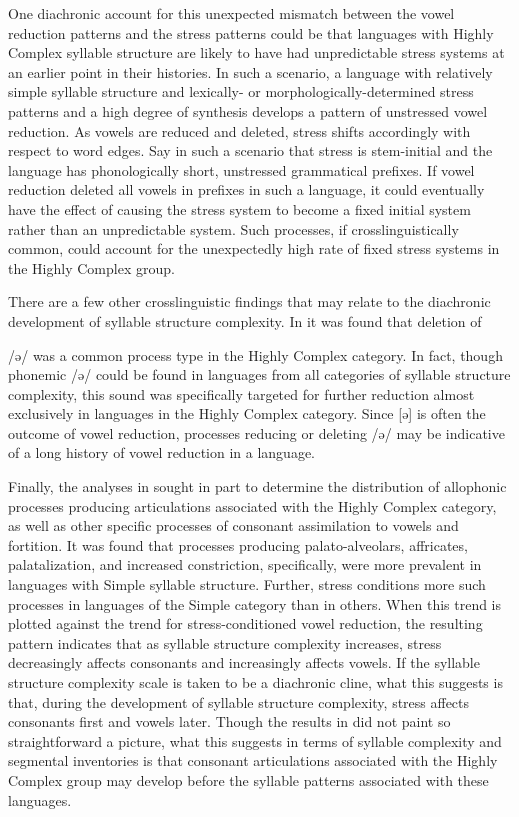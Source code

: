   One diachronic account for this unexpected mismatch between the vowel reduction patterns and the stress patterns could be that languages with Highly Complex syllable structure are likely to have had unpredictable stress systems at an earlier point in their histories. In such a scenario, a language with relatively simple syllable structure and lexically- or morphologically-determined stress patterns and a high degree of synthesis develops a pattern of unstressed vowel reduction. As vowels are reduced and deleted, stress shifts accordingly with respect to word edges. Say in such a scenario that stress is stem-initial and the language has phonologically short, unstressed grammatical prefixes. If vowel reduction deleted all vowels in prefixes in such a language, it could eventually have the effect of causing the stress system to become a fixed initial system rather than an unpredictable system. Such processes, if crosslinguistically common, could account for the unexpectedly high rate of fixed stress systems in the Highly Complex group.

  There are a few other crosslinguistic findings that may relate to the diachronic development of syllable structure complexity. In  it was found that deletion of 

/ə/ was a common process type in the Highly Complex category. In fact, though phonemic /ə/ could be found in languages from all categories of syllable structure complexity, this sound was specifically targeted for further reduction almost exclusively in languages in the Highly Complex category. Since [ə] is often the outcome of vowel reduction, processes reducing or deleting /ə/ may be indicative of a long history of vowel reduction in a language.

  Finally, the analyses in  sought in part to determine the distribution of allophonic processes producing articulations associated with the Highly Complex category, as well as other specific processes of consonant assimilation to vowels and fortition. It was found that processes producing palato-alveolars, affricates, palatalization, and increased constriction, specifically, were more prevalent in languages with Simple syllable structure. Further, stress conditions more such processes in languages of the Simple category than in others. When this trend is plotted against the trend for stress-conditioned vowel reduction, the resulting pattern indicates that as syllable structure complexity increases, stress decreasingly affects consonants and increasingly affects vowels. If the syllable structure complexity scale is taken to be a diachronic cline, what this suggests is that, during the development of syllable structure complexity, stress affects consonants first and vowels later. Though the results in  did not paint so straightforward a picture, what this suggests in terms of syllable complexity and segmental inventories is that consonant articulations associated with the Highly Complex group may develop before the syllable patterns associated with these languages.

